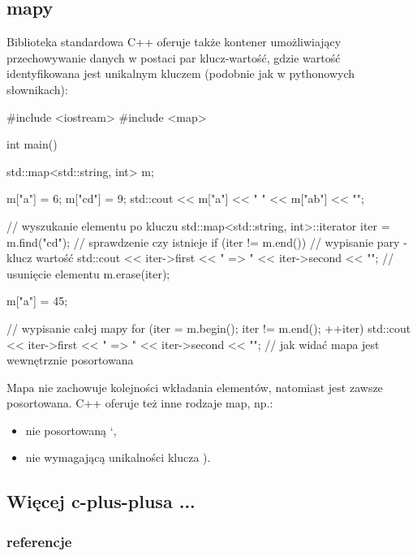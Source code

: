 \subsection{mapy}

Biblioteka standardowa C++ oferuje także kontener umożliwiający przechowywanie danych w postaci par klucz-wartość, gdzie wartość identyfikowana jest unikalnym kluczem (podobnie jak w pythonowych słownikach):

\begin{CodeFrame*}[cpp]{}
#include <iostream>
#include <map>

int main() {
    std::map<std::string, int> m;
    
    m["a"] = 6;
    m["cd"] = 9;
    std::cout << m["a"] << " " << m["ab"] << "\n";
    
    // wyszukanie elementu po kluczu
    std::map<std::string, int>::iterator iter = m.find("cd");
    // sprawdzenie czy istnieje
    if (iter != m.end()) {
        // wypisanie pary - klucz wartość
        std::cout << iter->first << " => " << iter->second << "\n";
        // usunięcie elementu
        m.erase(iter);
    }
    
    m["a"] = 45;
    
    // wypisanie całej mapy
    for (iter = m.begin(); iter != m.end(); ++iter)
        std::cout << iter->first << " => " << iter->second << "\n";
    // jak widać mapa jest wewnętrznie posortowana
}
\end{CodeFrame*}

Mapa  nie zachowuje kolejności wkładania elementów,
natomiast jest zawsze posortowana. C++ oferuje też inne rodzaje map, np.:
\begin{itemize}
  \item nie posortowaną `,
  \item nie wymagającą unikalności klucza ).
\end{itemize}


\subsection{Więcej c-plus-plusa ...}

\subsubsection{referencje}

